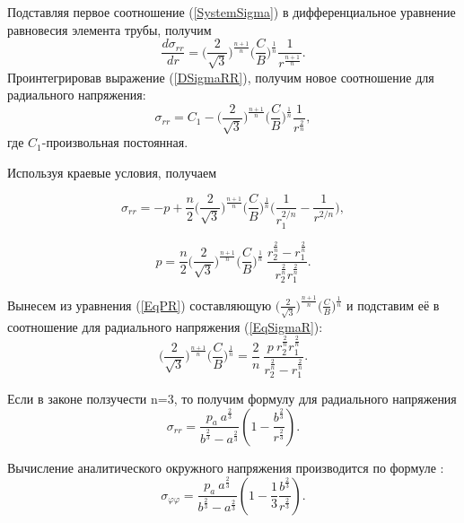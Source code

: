 \documentclass[a4paper,14pt]{extarticle}
\begin{document}
Подставляя первое соотношение (\ref{SystemSigma}) в дифференциальное уравнение равновесия элемента трубы, получим
\begin{equation}\label{DSigmaRR}
\frac{d\sigma_{rr}}{dr}=\bigg(\frac{2}{\sqrt{3}}\bigg)^{\tfrac{n+1}{n}} \bigg(\frac{C}{B}\bigg)^{\tfrac{1}{n}}\frac{1}{r^{\frac{n+1}{n}}}.
\end{equation}
\newpage
Проинтегрировав выражение (\ref{DSigmaRR}), получим новое соотношение для радиального напряжения: 
\begin{equation}
\sigma_{rr}=C_{1}-\bigg(\frac{2}{\sqrt{3}}\bigg)^{\tfrac{n+1}{n}} \bigg(\frac{C}{B}\bigg)^{\tfrac{1}{n}}\frac{1}{r^{\frac{2}{n}}}, 
\end{equation}
где $C_1$-произвольная постоянная.

Используя краевые условия, получаем

\begin{equation}\label{EqSigmaR}
\sigma_{rr}=-p+\frac{n}{2}\bigg(\dfrac{2}{\sqrt{3}}\bigg)^{\tfrac{n+1}{n}} \bigg(\frac{C}{B}\bigg)^{\tfrac{1}{n}}\Bigg(\frac{1}{r_{1}^{2/n}}-\frac{1}{r^{2/n}}\Bigg),
\end{equation}

\begin{equation}\label{EqPR}
p=\frac{n}{2}\bigg(\frac{2}{\sqrt{3}}\bigg)^{\tfrac{n+1}{n}} \bigg(\frac{C}{B}\bigg)^{\tfrac{1}{n}}\ \frac{r_{2}^{\frac{2}{n}}-r_{1}^{\frac{2}{n}}}{r_{2}^{\frac{2}{n}} r_{1}^{\frac{2}{n}}}.
\end{equation}

Вынесем из уравнения (\ref{EqPR}) составляющую $\Big(\frac{2}{\sqrt{3}}\Big)^{\tfrac{n+1}{n}} \Big(\frac{C}{B}\Big)^{\tfrac{1}{n}}$ и подставим её в соотношение для радиального напряжения (\ref{EqSigmaR}):
\begin{equation}\label{EqnUC}
\bigg(\frac{2}{\sqrt{3}}\bigg)^{\tfrac{n+1}{n}} \bigg(\frac{C}{B}\bigg)^{\tfrac{1}{n}}=\frac{2}{n}\ \frac{p\: r_{2}^{\tfrac{2}{n}} r_{1}^{\tfrac{2}{n}}}{r_{2}^{\tfrac{2}{n}}-r_{1}^{\tfrac{2}{n}}}.
\end{equation}

Если в законе ползучести n=3, то получим формулу для радиального напряжения
\begin{equation}\label{CSSigmaRResult}
\sigma_{rr}=\frac{p_a\: a^{\tfrac{2}{3}}}{b^{\tfrac{2}{3}}-a^{\tfrac{2}{3}}}\left(1-\frac{b^{\tfrac{2}{3}}}{r^{\tfrac{2}{3}}}\right).
\end{equation}


Вычисление аналитического окружного напряжения производится по формуле :
\begin{equation}\label{CSSigmaTResult}
\sigma_{\varphi\varphi}=\dfrac{p_a\: a^{\tfrac{2}{3}}}{b^{\tfrac{2}{3}}-a^{\tfrac{2}{3}}}\left(1-\frac{1}{3}\frac{b^{\tfrac{2}{3}}}{r^{\tfrac{2}{3}}}\right).
\end{equation}
\end{document}
